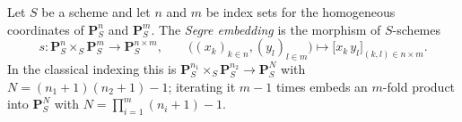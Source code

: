 \begin{definition}\label{def:chow-segre}
\leanok
Let $S$ be a scheme and let $n$ and $m$ be index sets for the homogeneous
coordinates of $\mathbf P^{n}_S$ and $\mathbf P^{m}_S$.  The \emph{Segre
embedding} is the morphism of $S$-schemes
\[
  s\colon\mathbf P^{n}_S\times_S\mathbf P^{m}_S
  \longrightarrow\mathbf P^{n\times m}_S,
  \qquad
  \bigl((x_k)_{k\in n},(y_l)_{l\in m}\bigr)
  \longmapsto
  \bigl[x_k\,y_l\bigr]_{(k,l)\in n\times m} .
\]
In the classical indexing this is
$\mathbf P^{n_1}_S\times_S\mathbf P^{n_2}_S\to\mathbf P^{N}_S$ with
$N=(n_1+1)(n_2+1)-1$; iterating it $m-1$ times embeds an $m$-fold product
into $\mathbf P^{N}_S$ with $N=\prod_{i=1}^m(n_i+1)-1$.
\end{definition}

